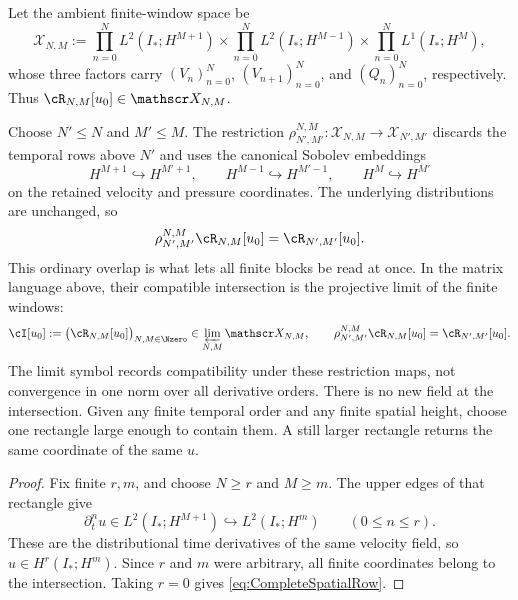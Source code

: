 Let the ambient finite-window space be
\[
  \mathscr X_{N,M}
  :=
  \prod_{n=0}^{N}L^2(I_*;H^{M+1})
  \times
  \prod_{n=0}^{N}L^2(I_*;H^{M-1})
  \times
  \prod_{n=0}^{N}L^1(I_*;H^M),
\]
whose three factors carry \((V_n)_{n=0}^{N}\),
\((V_{n+1})_{n=0}^{N}\), and \((Q_n)_{n=0}^{N}\), respectively.
Thus \(\cR_{N,M}[u_0]\in\mathscr X_{N,M}\).

Choose \(N'\leq N\) and \(M'\leq M\).
The restriction \(\rho_{N',M'}^{N,M}:\mathscr X_{N,M}\to\mathscr X_{N',M'}\)
discards the temporal rows above \(N'\) and uses the canonical Sobolev embeddings
\[
  H^{M+1}\hookrightarrow H^{M'+1},
  \qquad
  H^{M-1}\hookrightarrow H^{M'-1},
  \qquad
  H^M\hookrightarrow H^{M'}
\]
on the retained velocity and pressure coordinates.
The underlying distributions are unchanged, so
\begin{equation}\label{eq:BodyRectangleRestrictionCompatibility}
  \rho_{N',M'}^{N,M}\cR_{N,M}[u_0]
  =\cR_{N',M'}[u_0].
\end{equation}
This ordinary overlap is what lets all finite blocks be read at once.
In the matrix language above, their compatible intersection is the projective limit of the finite windows:
\begin{equation}\label{eq:DatumSpecificCompatibleIntersection}
  \cI[u_0]
  :=\bigl(\cR_{N,M}[u_0]\bigr)_{N,M\in\Nzero}
  \in\varprojlim_{N,M}\mathscr X_{N,M},
  \qquad
  \rho_{N',M'}^{N,M}\cR_{N,M}[u_0]
  =\cR_{N',M'}[u_0].
\end{equation}
The limit symbol records compatibility under these restriction maps, not convergence in one norm over all derivative orders.
There is no new field at the intersection.  Given any finite temporal order and any
finite spatial height, choose one rectangle large enough to contain them.  A still
larger rectangle returns the same coordinate of the same \(u\).


\begin{proof}
Fix finite \(r,m\), and choose \(N\geq r\) and \(M\geq m\).  The upper edges of
that rectangle give
\[
  \partial_t^nu\in L^2(I_*;H^{M+1})
  \hookrightarrow L^2(I_*;H^m)
  \qquad(0\leq n\leq r).
\]
These are the distributional time derivatives of the same velocity field, so
\(u\in H^r(I_*;H^m)\).  Since \(r\) and \(m\) were arbitrary, all finite coordinates
belong to the intersection.  Taking \(r=0\) gives \eqref{eq:CompleteSpatialRow}.
\end{proof}
